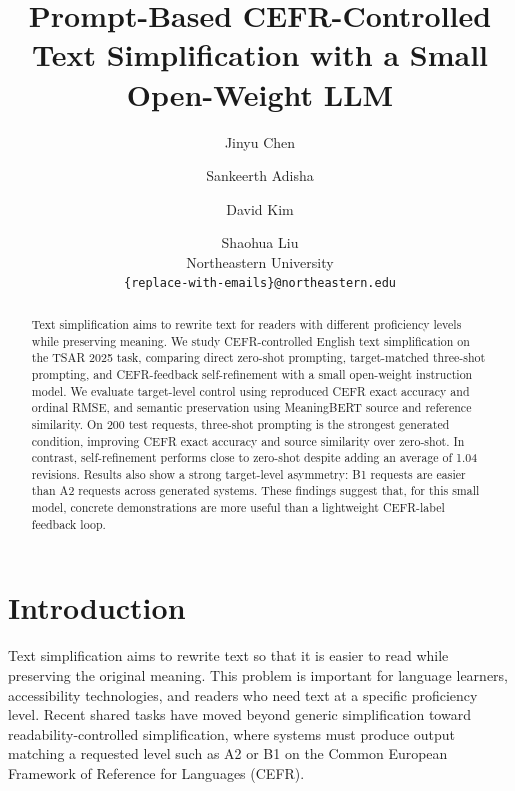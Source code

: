 \documentclass[11pt]{article}
\title{Prompt-Based CEFR-Controlled Text Simplification with a Small Open-Weight LLM}
\author{
  Jinyu Chen \and
  Sankeerth Adisha \and
  David Kim \and
  Shaohua Liu \\
  Northeastern University \\
  \texttt{\{replace-with-emails\}@northeastern.edu}
}
\begin{document}
\maketitle

\begin{abstract}
Text simplification aims to rewrite text for readers with different proficiency levels while preserving meaning. We study CEFR-controlled English text simplification on the TSAR 2025 task, comparing direct zero-shot prompting, target-matched three-shot prompting, and CEFR-feedback self-refinement with a small open-weight instruction model. We evaluate target-level control using reproduced CEFR exact accuracy and ordinal RMSE, and semantic preservation using MeaningBERT source and reference similarity. On 200 test requests, three-shot prompting is the strongest generated condition, improving CEFR exact accuracy and source similarity over zero-shot. In contrast, self-refinement performs close to zero-shot despite adding an average of 1.04 revisions. Results also show a strong target-level asymmetry: B1 requests are easier than A2 requests across generated systems. These findings suggest that, for this small model, concrete demonstrations are more useful than a lightweight CEFR-label feedback loop.
\end{abstract}

\section{Introduction}

Text simplification aims to rewrite text so that it is easier to read while preserving the original meaning. This problem is important for language learners, accessibility technologies, and readers who need text at a specific proficiency level. Recent shared tasks have moved beyond generic simplification toward readability-controlled simplification, where systems must produce output matching a requested level such as A2 or B1 on the Common European Framework of Reference for Languages (CEFR).
\end{document}
